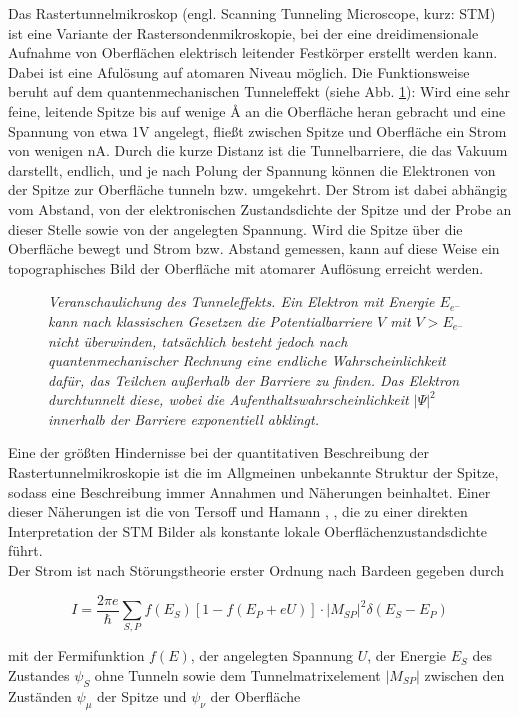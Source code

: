 Das Rastertunnelmikroskop (engl. Scanning Tunneling Microscope, kurz: STM) ist eine Variante der
Rastersondenmikroskopie, bei der eine dreidimensionale Aufnahme von Oberflächen elektrisch
leitender Festkörper erstellt werden kann. Dabei ist eine Afulösung auf atomaren Niveau möglich. Die
Funktionsweise beruht auf dem quantenmechanischen Tunneleffekt (siehe Abb. \ref{tunnel}): Wird eine
sehr feine, leitende Spitze bis auf wenige {\AA} an die Oberfläche heran gebracht und eine Spannung
von etwa 1V angelegt, fließt zwischen Spitze und Oberfläche ein Strom von wenigen nA. Durch
die kurze Distanz ist die Tunnelbarriere, die das Vakuum darstellt, endlich, und je nach Polung der Spannung können
die Elektronen von der Spitze zur Oberfläche tunneln bzw.
umgekehrt. Der Strom ist dabei abhängig vom Abstand, von der elektronischen Zustandsdichte der
Spitze und der Probe an dieser Stelle sowie von der angelegten Spannung. Wird die Spitze
über die Oberfläche bewegt und Strom bzw.
Abstand gemessen, kann auf diese Weise ein topographisches Bild der Oberfläche mit atomarer
Auflösung erreicht werden. 

\begin{figure}[H]
\centering
\sffamily 

\caption{\textit{Veranschaulichung des Tunneleffekts. Ein Elektron mit Energie $E_{e^-}$ kann nach
klassischen Gesetzen die Potentialbarriere $V$ mit $V>E_{e^-}$ nicht überwinden, tatsächlich besteht
jedoch nach quantenmechanischer Rechnung eine endliche Wahrscheinlichkeit dafür, das Teilchen
außerhalb der Barriere zu finden. Das Elektron durchtunnelt diese, wobei die
Aufenthaltswahrscheinlichkeit $|\Psi|^2$ innerhalb der Barriere exponentiell abklingt. }}
\label{tunnel}
\end{figure}


Eine der größten Hindernisse bei der quantitativen Beschreibung der Rastertunnelmikroskopie ist die
im Allgmeinen unbekannte Struktur der Spitze, sodass eine Beschreibung immer Annahmen und Näherungen
beinhaltet. Einer dieser Näherungen ist die von Tersoff und Hamann \cite{Ter83}, \cite{Ter85}, die
zu einer direkten Interpretation der STM Bilder als konstante lokale Oberflächenzustandsdichte führt.\\
Der Strom ist nach Störungstheorie erster Ordnung nach Bardeen \cite{Bar} gegeben durch

\[I=\frac{2\pi e}{\hbar}\sum_{S,P}
f(E_{S})[1-f(E_{P}+eU)]\cdot|M_{SP}|^2\delta(E_{S}-E_{P})\]

mit der Fermifunktion $f(E)$, der angelegten Spannung $U$, der Energie
$E_{S}$ des Zustandes $\psi_{S}$ ohne Tunneln sowie dem Tunnelmatrixelement $|M_{SP}|$
zwischen den Zuständen $\psi_{\mu}$ der Spitze und $\psi_{\nu}$ der Oberfläche

